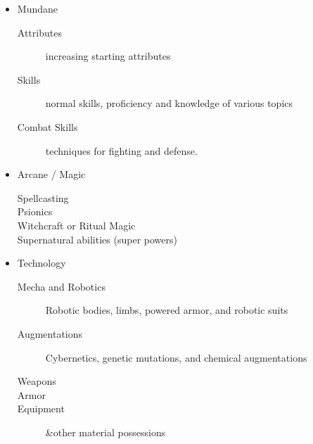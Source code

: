\documentclass[twoside]{book}
\begin{document}
\begin{itemize}
      
  \item 
    {  
    Mundane
\begin{description}
    
  \item[Attributes] 
    {  
    increasing starting attributes
    }
  
  \item[Skills] 
    {  
    normal skills, proficiency and knowledge of various topics
    }
  
  \item[Combat Skills] 
    {  
    techniques for fighting and defense.
    }
  
\end{description}
  
    }
  
  \item 
    {  
    Arcane / Magic
\begin{description}
    
  \item[Spellcasting] 
    {  
    
    }
  
  \item[Psionics] 
    {  
    
    }
  
  \item[Witchcraft or Ritual Magic] 
    {  
    
    }
  
  \item[Supernatural abilities (super powers)] 
    {  
    
    }
  
\end{description}
  
    }
  
  \item 
    {  
    Technology
\begin{description}
    
  \item[Mecha and Robotics] 
    {  
    Robotic bodies, limbs, powered armor, and robotic suits
    }
  
  \item[Augmentations] 
    {  
    Cybernetics, genetic mutations, and chemical augmentations
    }
  
  \item[Weapons] 
    {  
    
    }
  
  \item[Armor] 
    {  
    
    }
  
  \item[Equipment] 
    {  
    \&other material possessions
    }
  
\end{description}
  
    }
  
\end{itemize}
  
\end{document}
